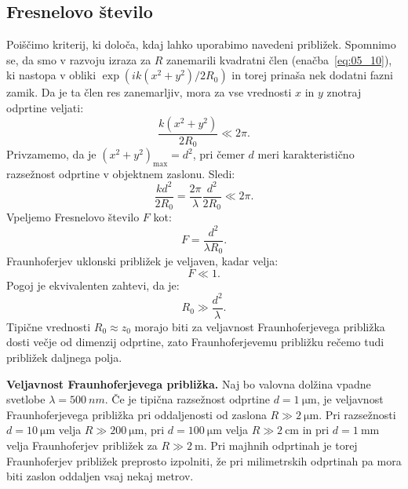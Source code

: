 \subsection*{Fresnelovo število}
Poiščimo kriterij, ki določa, kdaj lahko uporabimo navedeni približek. Spomnimo se, da smo
v razvoju izraza za $R$ zanemarili kvadratni člen (enačba~\ref{eq:05_10}), ki 
nastopa v obliki $\exp(ik(x^2 + y^2)/2R_0)$ in torej prinaša nek dodatni fazni zamik. 
Da je ta člen res zanemarljiv, mora za vse vrednosti $x$ in $y$ znotraj odprtine veljati:
\begin{equation}
\frac{k(x^2+y^2)}{2R_0} \ll 2 \pi.
\label{eq:05_15}
\end{equation}
Privzamemo, da je $(x^2+y^2)_\mathrm{max} = d^2$, pri čemer $d$ meri karakteristično razsežnost 
odprtine v objektnem zaslonu. Sledi:
\begin{equation}
\frac{kd^2}{2R_0}  = \frac{2\pi}{\lambda}\frac{d^2}{2R_0}\ll 2 \pi.
\label{eq:05_16}
\end{equation}
Vpeljemo Fresnelovo število $F$ kot:
\begin{equation}
F  = \frac{d^2}{\lambda R_0}.
\label{eq:05_17}
\end{equation}
Fraunhoferjev uklonski približek je veljaven, kadar velja:
\begin{equation}
F \ll 1. 
\label{eq:05_18}
\end{equation}
Pogoj je ekvivalenten zahtevi, da je: 
\begin{equation}
R_0 \gg \frac{d^2}{\lambda}.
\label{eq:05_19}
\end{equation}
Tipične vrednosti $R_0 \approx z_0$  morajo biti za veljavnost Fraunhoferjevega 
približka dosti večje od dimenzij odprtine, zato 
Fraunhoferjevemu približku rečemo tudi približek daljnega polja. 

\begin{example}{\bf Veljavnost Fraunhoferjevega približka.}
\label{ex:fh}
Naj bo valovna dolžina vpadne svetlobe $\lambda=500~\si{nm}$. Če je tipična 
razsežnost odprtine $d = 1~\si{\micro\metre}$, je veljavnost 
Fraunhoferjevega približka pri oddaljenosti od zaslona 
$R\gg 2~\si{\micro\metre}$. Pri razsežnosti
$d = 10~\si{\micro\metre}$ velja $R\gg 200~\si{\micro\metre}$, 
pri $d = 100~\si{\micro\metre}$ velja $R\gg 2~\si{\centi\metre}$ in 
pri $d = 1~\si{\milli\metre}$ velja Fraunhoferjev približek za
$R\gg 2~\si{\metre}$. Pri majhnih odprtinah je torej Fraunhoferjev približek
preprosto izpolniti, že pri milimetrskih odprtinah
pa mora biti zaslon oddaljen vsaj nekaj metrov. 
\end{example}

